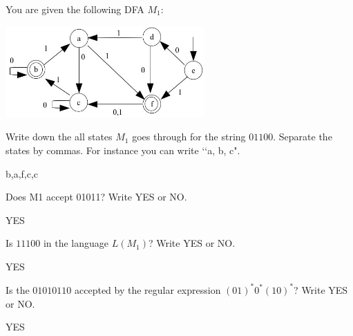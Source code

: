 

\renewcommand\AUTHOR{nweadick1@cougars.ccis.edu} %


\topmattertwo



You are given the following DFA $M_1$:
\begin{center}
\includegraphics[width=3in]{Capture.JPG}
\end{center}
\nextq
Write down the all states $M_1$ goes through for the string $01100$.
Separate the states by commas. For instance you can write \lq\lq a, b, c".
\\
\ANSWER
\begin{answerlong}
b,a,f,c,c
\end{answerlong}

\nextq
Does M1 accept 01011?
Write YES or NO.
\\
\ANSWER
\begin{answerlong}
YES
\end{answerlong}

\nextq
Is $11100$ in the language $L(M_1)$?
Write YES or NO.
\\
\ANSWER
\begin{answerlong}
YES
\end{answerlong}

\nextq
Is the $01010110$ accepted by the regular expression $(01)^*0^*(10)^*$?
Write YES or NO.
\\
\ANSWER
\begin{answerlong}
YES
\end{answerlong}

\newpage


